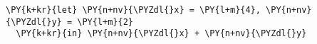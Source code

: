 \begin{Verbatim}[commandchars=\\\{\}]
\PY{k+kr}{let} \PY{n+nv}{\PYZdl{}x} = \PY{l+m}{4}, \PY{n+nv}{\PYZdl{}y} = \PY{l+m}{2}
  \PY{k+kr}{in} \PY{n+nv}{\PYZdl{}x} + \PY{n+nv}{\PYZdl{}y}
\end{Verbatim}
